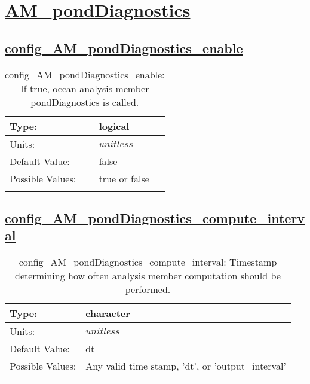 \section[AM\_pondDiagnostics]{\hyperref[sec:nm_tab_AM_pondDiagnostics]{AM\_pondDiagnostics}}
\label{sec:nm_sec_AM_pondDiagnostics}
\subsection[config\_AM\_pondDiagnostics\_enable]{\hyperref[sec:nm_tab_AM_pondDiagnostics]{config\_AM\_pondDiagnostics\_enable}}
\label{subsec:nm_sec_config_AM_pondDiagnostics_enable}
\begin{center}
\begin{longtable}{| p{2.0in} || p{4.0in} |}
    \hline
    Type: & logical \\
    \hline
    Units: & $unitless$ \\
    \hline
    Default Value: & false \\
    \hline
    Possible Values: & true or false \\
    \hline
    \caption{config\_AM\_pondDiagnostics\_enable: If true, ocean analysis member pondDiagnostics is called.}
\end{longtable}
\end{center}
\subsection[config\_AM\_pondDiagnostics\_compute\_interval]{\hyperref[sec:nm_tab_AM_pondDiagnostics]{config\_AM\_pondDiagnostics\_compute\_interval}}
\label{subsec:nm_sec_config_AM_pondDiagnostics_compute_interval}
\begin{center}
\begin{longtable}{| p{2.0in} || p{4.0in} |}
    \hline
    Type: & character \\
    \hline
    Units: & $unitless$ \\
    \hline
    Default Value: & dt \\
    \hline
    Possible Values: & Any valid time stamp, 'dt', or 'output\_interval' \\
    \hline
    \caption{config\_AM\_pondDiagnostics\_compute\_interval: Timestamp determining how often analysis member computation should be performed.}
\end{longtable}
\end{center}
